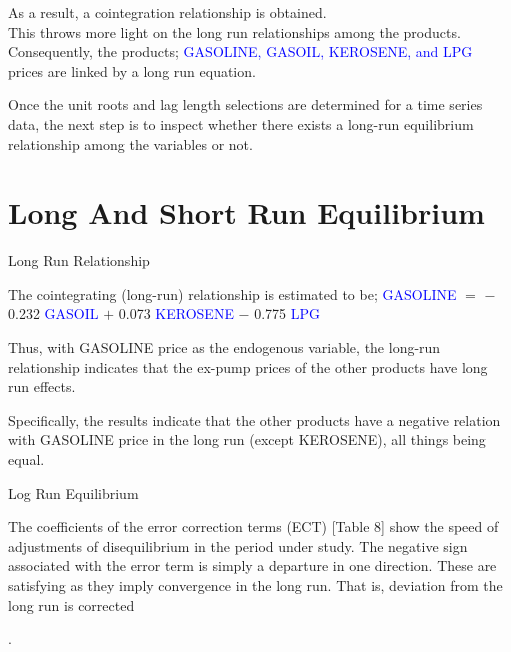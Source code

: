 \documentclass{beamer}
\newcommand{\vspaceFive}{\vspace{5pt}}
\newcommand{\vspaceTen}{\vspace{10pt}}
\newcommand{\textHighlight}[1]{\textcolor{blue}{#1}}
\begin{document}
	\begin{frame}
		\begin{block}{}
			As a result, a cointegration relationship is obtained. \\ 
			This throws more light on the long run relationships among the products.\\
			 Consequently, the products; \textHighlight{GASOLINE, GASOIL, KEROSENE, and LPG} prices are linked by a 
			long run equation. 
		\end{block}
	
		\begin{block}{}
			Once the unit roots and lag length selections are determined for a time series data, the next step is to inspect whether there exists a long-run equilibrium relationship among the variables or not.
		\end{block}
	\end{frame}
		
	
	\section{Long And Short Run Equilibrium}
	\begin{frame}{Long Run Relationship}
		\begin{block}{The cointegrating (long-run) relationship is estimated to be;}
			\vspaceFive
			\textHighlight{GASOLINE} $ = $ $-$ 0.232 \textHighlight{GASOIL} $ + $  0.073 \textHighlight{KEROSENE} $-$ 0.775 \textHighlight{LPG}
			\vspaceFive 
		\end{block} 
		\vspaceFive
		
		Thus, with GASOLINE price as the endogenous variable, the long-run relationship indicates that the ex-pump prices of the other products have long run effects. \\ \vspaceTen
		
		Specifically, the results indicate that the other products have a negative relation with GASOLINE price in the long run (except KEROSENE), all things being equal.
	\end{frame}

	\begin{frame}{Log Run Equilibrium}
		\begin{block}{}
			The coefficients of the error correction terms (ECT) [Table 8] show the speed of adjustments of disequilibrium in the period under study. The negative sign associated with the error term is simply a departure in one direction. These are satisfying as they imply convergence in the long run. That is, deviation from the long run is corrected
		\end{block}.
	\end{frame}
\end{document}
